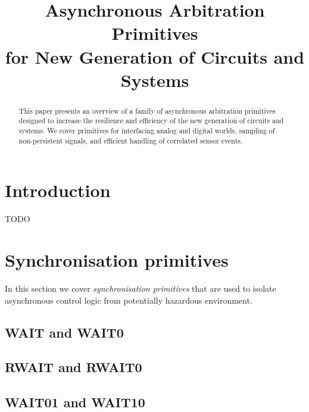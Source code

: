 \documentclass[conference]{IEEEtran}
\begin{document}
\title{Asynchronous Arbitration Primitives\\for New Generation of Circuits and Systems}

\author{
}

\maketitle

\begin{abstract}
This paper presents an overview of a family of asynchronous arbitration
primitives designed to increase the resilience and efficiency of
the new generation of circuits and systems. We cover primitives for
interfacing analog and digital worlds, sampling of non-persistent
signals, and efficient handling of correlated sensor events.
\end{abstract}


\section{Introduction}

TODO


\section{Synchronisation primitives}

In this section we cover \emph{synchronisation primitives} that are used to
isolate asynchronous control logic from potentially hazardous environment.

\subsection{WAIT and WAIT0}

\subsection{RWAIT and RWAIT0}

\subsection{WAIT01 and WAIT10}
\end{document}
